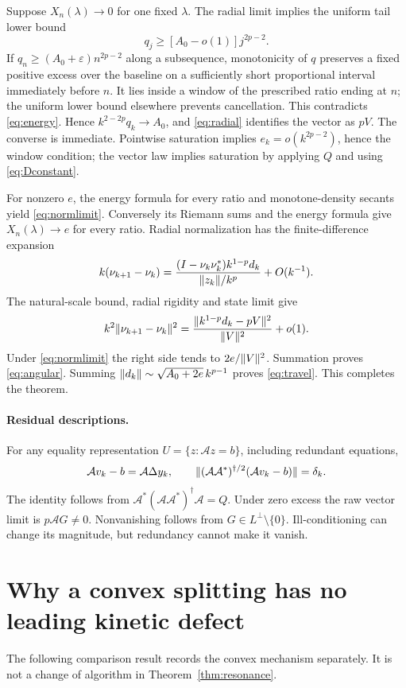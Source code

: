 \documentclass[11pt]{article}
\theoremstyle{remark}\newtheorem{remark}[theorem]{Remark}
\newcommand{\eps}{\varepsilon}\newcommand{\dd}{\Delta}
\numberwithin{equation}{section}
\begin{document}
Suppose $X_n(\lambda)\to0$ for one fixed $\lambda$. The radial limit implies the uniform tail lower bound
\[
 q_j\geq[A_0-o(1)]j^{2p-2}.
\]
If $q_n\geq(A_0+\eps)n^{2p-2}$ along a subsequence, monotonicity of $q$ preserves a fixed positive excess over the baseline on a sufficiently short proportional interval immediately before $n$. It lies inside a window of the prescribed ratio ending at $n$; the uniform lower bound elsewhere prevents cancellation. This contradicts \eqref{eq:energy}. Hence $k^{2-2p}q_k\to A_0$, and \eqref{eq:radial} identifies the vector as $pV$. The converse is immediate. Pointwise saturation implies $e_k=o(k^{2p-2})$, hence the window condition; the vector law implies saturation by applying $Q$ and using \eqref{eq:Dconstant}.

For nonzero $e$, the energy formula for every ratio and monotone-density secants yield \eqref{eq:normlimit}. Conversely its Riemann sums and the energy formula give $X_n(\lambda)\to e$ for every ratio. Radial normalization has the finite-difference expansion
\[
 k(\nu_{k+1}-\nu_k)=
 \frac{(I-\nu_k\nu_k^*)k^{1-p}d_k}{\lVert z_k\rVert/k^p}+O(k^{-1}).
\]
The natural-scale bound, radial rigidity and state limit give
\[
 k^2\lVert \nu_{k+1}-\nu_k\rVert^2
 =\frac{\lVert k^{1-p}d_k-pV\rVert^2}{\lVert V\rVert^2}+o(1).
\]
Under \eqref{eq:normlimit} the right side tends to $2e/\lVert V\rVert^2$. Summation proves \eqref{eq:angular}. Summing $\lVert d_k\rVert\sim\sqrt{A_0+2e}\,k^{p-1}$ proves \eqref{eq:travel}. This completes the theorem.

\paragraph{Residual descriptions.}
For any equality representation $U=\{z:\mathcal A z=b\}$, including redundant equations,
\[
 \mathcal A v_k-b=\mathcal A\dd y_k,\qquad
 \norm{(\mathcal A\mathcal A^*)^{\dagger/2}(\mathcal A v_k-b)}=\delta_k.
\]
The identity follows from $\mathcal A^*(\mathcal A\mathcal A^*)^\dagger\mathcal A=Q$. Under zero excess the raw vector limit is $p\mathcal A G\ne0$. Nonvanishing follows from $G\in L^\perp\setminus\{0\}$. Ill-conditioning can change its magnitude, but redundancy cannot make it vanish.

\section{Why a convex splitting has no leading kinetic defect}
The following comparison result records the convex mechanism separately. It is not a change of algorithm in Theorem~\ref{thm:resonance}.
\end{document}
